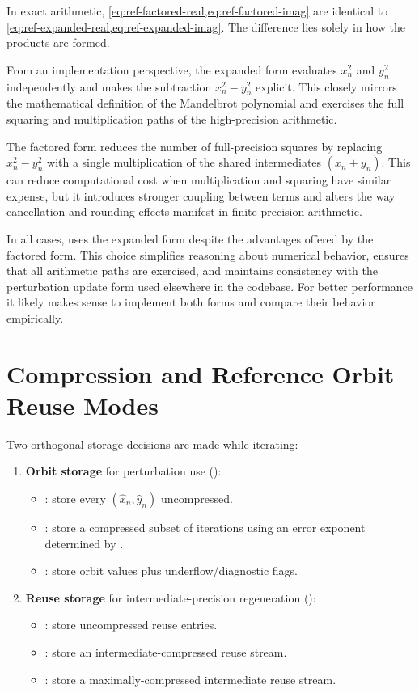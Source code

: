 In exact arithmetic, \cref{eq:ref-factored-real,eq:ref-factored-imag} are
identical to \cref{eq:ref-expanded-real,eq:ref-expanded-imag}. The difference
lies solely in how the products are formed.

From an implementation perspective, the expanded form evaluates
$x_n^2$ and $y_n^2$ independently and makes the subtraction
$x_n^2 - y_n^2$ explicit. This closely mirrors the mathematical definition
of the Mandelbrot polynomial and exercises the full squaring and
multiplication paths of the high-precision arithmetic.

The factored form reduces the number of full-precision squares by replacing
$x_n^2 - y_n^2$ with a single multiplication of the shared intermediates
$(x_n \pm y_n)$. This can reduce computational cost when multiplication and
squaring have similar expense, but it introduces stronger coupling between
terms and alters the way cancellation and rounding effects manifest in
finite-precision arithmetic.

In all cases, \FractalShark{} uses the expanded form despite the advantages offered
by the factored form. This choice simplifies reasoning about numerical behavior,
ensures that all arithmetic paths are exercised, and maintains consistency with
the perturbation update form used elsewhere in the codebase.  For better
performance it likely makes sense to implement both forms and compare their behavior
empirically.

\section{Compression and Reference Orbit Reuse Modes}
\label{subsec:ref-orbit-compression-reuse}

Two orthogonal storage decisions are made while iterating:

\begin{enumerate}
  \item \textbf{Orbit storage} for perturbation use ():
  \begin{itemize}
    \item {}: store every \((\hat{x}_n,\hat{y}_n)\) uncompressed.
    \item {}: store a compressed subset of iterations using an error exponent
          determined by .
    \item {}: store orbit values plus underflow/diagnostic flags.
  \end{itemize}
  \item \textbf{Reuse storage} for intermediate-precision regeneration ():
  \begin{itemize}
    \item {}: store uncompressed  reuse entries.
    \item {}: store an intermediate-compressed reuse stream.
    \item {}: store a maximally-compressed intermediate reuse stream.
  \end{itemize}
\end{enumerate}

